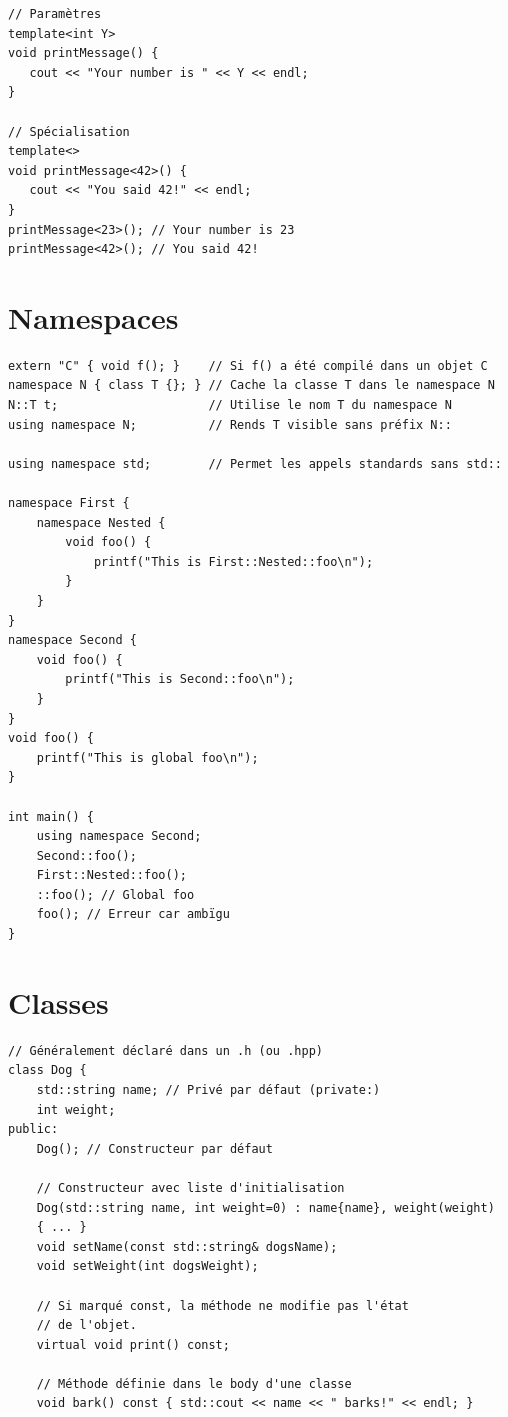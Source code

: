 \documentclass{article}
\begin{document}
\begin{multicols*}{3}
\begin{lstlisting}
// Paramètres
template<int Y>
void printMessage() {
   cout << "Your number is " << Y << endl;
}

// Spécialisation
template<>
void printMessage<42>() {
   cout << "You said 42!" << endl;
}
printMessage<23>(); // Your number is 23
printMessage<42>(); // You said 42!

\end{lstlisting}

\section*{Namespaces}

\begin{lstlisting}
extern "C" { void f(); }    // Si f() a été compilé dans un objet C
namespace N { class T {}; } // Cache la classe T dans le namespace N
N::T t;                     // Utilise le nom T du namespace N
using namespace N;          // Rends T visible sans préfix N::

using namespace std;        // Permet les appels standards sans std::

namespace First {
    namespace Nested {
        void foo() {
            printf("This is First::Nested::foo\n");
        }
    }
}
namespace Second {
    void foo() {
        printf("This is Second::foo\n");
    }
}
void foo() {
    printf("This is global foo\n");
}

int main() {
    using namespace Second;
    Second::foo();
    First::Nested::foo();
    ::foo(); // Global foo
    foo(); // Erreur car ambïgu
}
\end{lstlisting}

\section*{Classes}

\begin{lstlisting}
// Généralement déclaré dans un .h (ou .hpp)
class Dog {
    std::string name; // Privé par défaut (private:)
    int weight;
public:
    Dog(); // Constructeur par défaut

    // Constructeur avec liste d'initialisation
    Dog(std::string name, int weight=0) : name{name}, weight(weight) 
    { ... } 
    void setName(const std::string& dogsName);
    void setWeight(int dogsWeight);

    // Si marqué const, la méthode ne modifie pas l'état
    // de l'objet.
    virtual void print() const;

    // Méthode définie dans le body d'une classe
    void bark() const { std::cout << name << " barks!" << endl; }


\end{lstlisting}
\end{multicols*}
\end{document}
